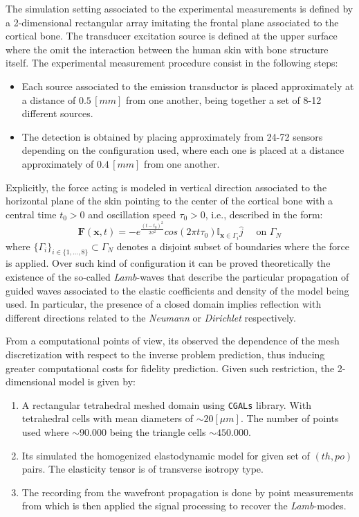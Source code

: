 The simulation setting associated to the experimental measurements is defined by a 2-dimensional rectangular array imitating the frontal plane associated to the cortical bone. The transducer excitation source is defined at the upper surface where the omit the interaction between the human skin with bone structure itself. 
The experimental measurement procedure consist in the following steps:
\begin{itemize}
    \item Each source associated to the emission transductor is placed approximately at a distance of $0.5 \, [mm]$ from one another, being together a set of 8-12 different sources. 
    \item The detection is obtained by placing approximately from 24-72 sensors depending on the configuration used, where each one is placed at a distance approximately of $0.4 \, [mm]$ from one another.
\end{itemize}
Explicitly, the force acting is modeled in vertical direction associated to the horizontal plane of the skin pointing to the center of the cortical bone with a central time $t_0 > 0$ and oscillation speed $\tau_0 > 0$, i.e., described in the form:
\begin{equation}
    \mathbf{F}(\mathbf{x},t) = - e^{\frac{(t-t_0)^2}{2\sigma^2}} cos( 2 \pi t \tau_0 ) \mathbb{I}_{\mathbf{x} \in \Gamma_i} \hat{j} \quad \text{ on } \Gamma_N
\end{equation}
where $\{ \Gamma_i\}_{ i \in \{1,\dots, 8\}} \subset \Gamma_N$ denotes a disjoint subset of boundaries where the force is applied. 
Over such kind of configuration it can be proved theoretically the existence of the so-called \textit{Lamb}-waves that describe the particular propagation of guided waves associated to the elastic coefficients and density of the model being used.
In particular, the presence of a closed domain implies reflection with different directions related to the \textit{Neumann} or \textit{Dirichlet} respectively.


From a computational points of view, its observed the dependence of the mesh discretization with respect to the inverse problem prediction, thus inducing greater computational costs for fidelity prediction. Given such restriction, the 2-dimensional model is given by:
\begin{enumerate}
    \item A rectangular tetrahedral meshed domain using \texttt{CGALs} library. With tetrahedral cells with mean diameters of $\sim 20 [\mu m]$. The number of points used where $\sim 90.000$ being the triangle cells $\sim 450.000$.
    \item Its simulated the homogenized elastodynamic model for given set of $(th, po)$ pairs. The elasticity tensor is of transverse isotropy type.
    \item The recording from the wavefront propagation is done by point measurements from which is then applied the signal processing to recover the \textit{Lamb}-modes.
\end{enumerate}

